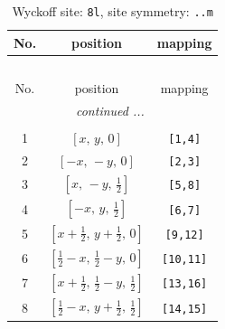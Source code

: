 \documentclass[fleqn,8pt]{jsarticle}
\begin{document}
\begin{longtable}{ccc}
\caption{Wyckoff site: {\tt 8l}, site symmetry: {\tt ..m}}
 \\
 \hline \hline
No. & position & mapping \\ \hline \endfirsthead

\multicolumn{2}{l}{\tablename\ \thetable{}} \\
 \hline \hline
No. & position & mapping \\ \hline \endhead

 \hline \hline
\multicolumn{2}{r}{\footnotesize\it continued ...} \\ \endfoot

 \hline \hline
\multicolumn{2}{r}{} \\ \endlastfoot

1 & $\left[ x,\, y,\, 0 \right]$ & {\tt [1,4]} \\ \hline
2 & $\left[ - x,\, - y,\, 0 \right]$ & {\tt [2,3]} \\ \hline
3 & $\left[ x,\, - y,\, \frac{1}{2} \right]$ & {\tt [5,8]} \\ \hline
4 & $\left[ - x,\, y,\, \frac{1}{2} \right]$ & {\tt [6,7]} \\ \hline
5 & $\left[ x + \frac{1}{2},\, y + \frac{1}{2},\, 0 \right]$ & {\tt [9,12]} \\ \hline
6 & $\left[ \frac{1}{2} - x,\, \frac{1}{2} - y,\, 0 \right]$ & {\tt [10,11]} \\ \hline
7 & $\left[ x + \frac{1}{2},\, \frac{1}{2} - y,\, \frac{1}{2} \right]$ & {\tt [13,16]} \\ \hline
8 & $\left[ \frac{1}{2} - x,\, y + \frac{1}{2},\, \frac{1}{2} \right]$ & {\tt [14,15]} \\
\end{longtable}
\renewcommand{\arraystretch}{1.2}
\end{document}
